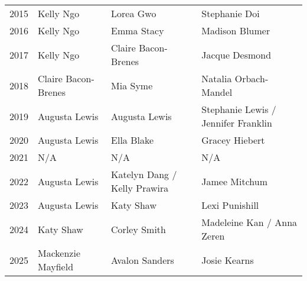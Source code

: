 \begin{table}[H]
{\begin{tabular}{c | l | l | l}
2015 & Kelly Ngo & Lorea Gwo & Stephanie Doi \\
2016 & Kelly Ngo & Emma Stacy & Madison Blumer \\
2017 & Kelly Ngo & Claire Bacon-Brenes & Jacque Desmond \\
2018 & Claire Bacon-Brenes & Mia Syme & Natalia Orbach-Mandel \\
2019 & Augusta Lewis & Augusta Lewis & Stephanie Lewis / Jennifer Franklin \\
2020 & Augusta Lewis & Ella Blake & Gracey Hiebert \\
2021 & N/A & N/A & N/A \\
2022 & Augusta Lewis & Katelyn Dang / Kelly Prawira & Jamee Mitchum \\
2023 & Augusta Lewis & Katy Shaw & Lexi Punishill \\
2024 & Katy Shaw & Corley Smith & Madeleine Kan / Anna Zeren \\
2025 & Mackenzie Mayfield & Avalon Sanders & Josie Kearns \\
\bottomrule
\end{tabular}%
}
\end{table}


